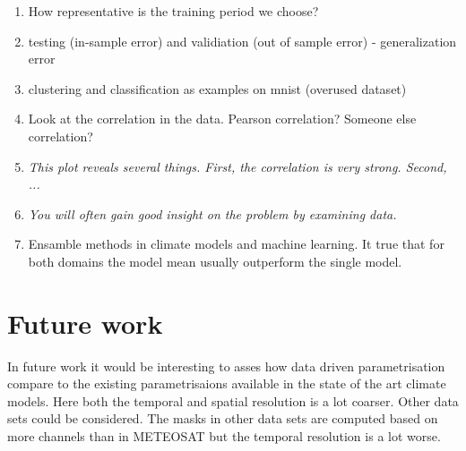 \begin{enumerate}
    \item How representative is the training period we choose?
    \item testing (in-sample error) and validiation (out of sample error) - generalization error 
    \item clustering and classification as examples on mnist (overused dataset)
    \item Look at the correlation in the data. Pearson correlation? Someone else correlation?
    \item \textit{This plot reveals several things. First, the correlation is very strong. Second, ... }
    \item \textit{You will often gain good insight on the problem by examining data.}
    \item Ensamble methods in climate models and machine learning. It true that for both domains the model mean usually outperform the single model.
\end{enumerate}

\section{Future work}
In future work it would be interesting to asses how data driven parametrisation compare to the existing parametrisaions available in the state of the art climate models. Here both the temporal and spatial resolution is a lot coarser. Other data sets could be considered. The masks in other data sets are computed based on more channels than in METEOSAT but the temporal resolution is a lot worse. 


